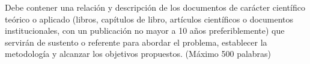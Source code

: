 \documentclass[../Main.tex]{subfiles}
\begin{document}
Debe contener una relación y descripción de los documentos de carácter científico teórico o
aplicado (libros, capítulos de libro, artículos científicos o documentos institucionales, con un
publicación no mayor a 10 años preferiblemente) que servirán de sustento o referente para
abordar el problema, establecer la metodología y alcanzar los objetivos propuestos.
(Máximo 500 palabras)
\end{document}
